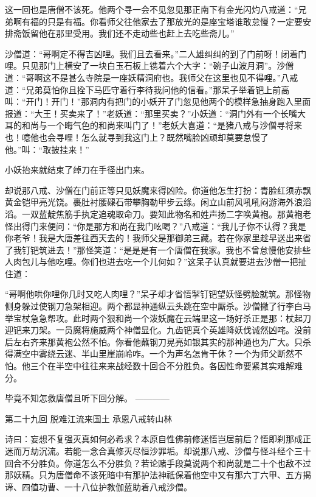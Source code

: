 \documentclass[12pt,UTF8]{ctexbook}
\begin{document}
这一回也是唐僧不该死。他两个寻一会不见忽见那正南下有金光闪灼八戒道：“兄弟啊有福的只是有福。你看师父往他家去了那放光的是座宝塔谁敢怠慢？一定要安排斋饭留他在那里受用。我们还不走动些也赶上去吃些斋儿。”

沙僧道：“哥啊定不得吉凶哩。我们且去看来。”二人雄纠纠的到了门前呀！闭着门哩。只见那门上横安了一块白玉石板上镌着六个大字：“碗子山波月洞”。沙僧道：“哥啊这不是甚么寺院是一座妖精洞府也。我师父在这里也见不得哩。”八戒道：“兄弟莫怕你且拴下马匹守着行李待我问他的信看。”那呆子举着钯上前高叫：“开门！开门！”那洞内有把门的小妖开了门忽见他两个的模样急抽身跑入里面报道：“大王！买卖来了！”老妖道：“那里买卖？”小妖道：“洞门外有一个长嘴大耳的和尚与一个晦气色的和尚来叫门了！”老妖大喜道：“是猪八戒与沙僧寻将来也！噫他也会寻哩！怎么就寻到我这门上？既然嘴脸凶顽却莫要怠慢了他。”叫：“取披挂来！”

小妖抬来就结束了绰刀在手径出门来。

却说那八戒、沙僧在门前正等只见妖魔来得凶险。你道他怎生打扮：青脸红须赤飘黄金铠甲亮光饶。裹肚衬腰磲石带攀胸勒甲步云绦。闲立山前风吼吼闷游海外浪滔滔。一双蓝靛焦筋手执定追魂取命刀。要知此物名和姓声扬二字唤黄袍。那黄袍老怪出得门来便问：“你是那方和尚在我门吆喝？”八戒道：“我儿子你不认得？我是你老爷！我是大唐差往西天去的！我师父是那御弟三藏。若在你家里趁早送出来省了我钉钯筑进去！”那怪笑道：“是是是有一个唐僧在我家。我也不曾怠慢他安排些人肉包儿与他吃哩。你们也进去吃一个儿何如？”这呆子认真就要进去沙僧一把扯住道：

“哥啊他哄你哩你几时又吃人肉哩？”呆子却才省悟掣钉钯望妖怪劈脸就筑。那怪物侧身躲过使钢刀急架相迎。两个都显神通纵云头跳在空中厮杀。沙僧撇了行李白马举宝杖急急帮攻。此时两个狠和尚一个泼妖魔在云端里这一场好杀正是那：杖起刀迎钯来刀架。一员魔将施威两个神僧显化。九齿钯真个英雄降妖伐诚然凶咤。没前后左右齐来那黄袍公然不怕。你看他蘸钢刀晃亮如银其实的那神通也为广大。只杀得满空中雾绕云迷、半山里崖崩岭咋。一个为声名怎肯干休？一个为师父断然不怕。他三个在半空中往往来来战经数十回合不分胜负。各因性命要紧其实难解难分。

毕竟不知怎救唐僧且听下回分解。
------------

第二十九回 脱难江流来国土 承恩八戒转山林

诗曰：妄想不复强灭真如何必希求？本原自性佛前修迷悟岂居前后？悟即刹那成正迷而万劫沉流。若能一念合真修灭尽恒沙罪垢。却说那八戒、沙僧与怪斗经个三十回合不分胜负。你道怎么不分胜负？若论赌手段莫说两个和尚就是二十个也敌不过那妖精。只为唐僧命不该死暗中有那护法神祇保着他空中又有那六丁六甲、五方揭谛、四值功曹、一十八位护教伽蓝助着八戒沙僧。
\end{document}

